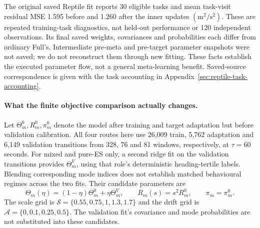 \documentclass[11pt]{article}
\begin{document}
The original saved Reptile fit reports 30 eligible tasks and mean
task-visit residual MSE 1.595 before and 1.260 after the inner updates
\((\mathrm{m}^2/\mathrm{s}^2)\). These are repeated training-task diagnostics,
not held-out performance or 120 independent observations. Its final saved
weights, covariances and probabilities each differ from ordinary Full's.
Intermediate pre-meta and pre-target parameter snapshots were not saved;
we do not reconstruct them through new fitting. These facts establish the
executed parameter flow, not a general meta-learning benefit. Saved-source
correspondence is given with the task accounting in
Appendix~\ref{sec:reptile-task-accounting}.

\paragraph{What the finite objective comparison actually changes.}
\label{sec:estimator-calibration}
Let \(\Theta_m^0,R_m^0,\pi_m^0\) denote the model after training and target
adaptation but before validation calibration. All four routes here use
26,009 train, 5,762 adaptation and 6,149 validation transitions from
328, 76 and 81 windows, respectively, at \(\tau=60\) seconds.
For mixed and pure-ES only, a second ridge fit on the validation transitions
provides \(\Theta_m^V\), using that role's deterministic heading-tertile
labels. Blending corresponding mode indices does not establish matched
behavioural regimes across the two fits. Their candidate parameters are
\begin{equation}
\Theta_m(\eta)=(1-\eta)\Theta_m^0+\eta\Theta_m^V,\qquad
R_m(s)=s^2R_m^0,\qquad \pi_m=\pi_m^0 .
\label{eq:estimator-drift-grid}
\end{equation}
The scale grid is \(\mathcal S=\{0.55,0.75,1,1.3,1.7\}\) and the drift
grid is \(\mathcal A=\{0,0.1,0.25,0.5\}\). The validation fit's covariance
and mode probabilities are not substituted into these candidates.
\end{document}

